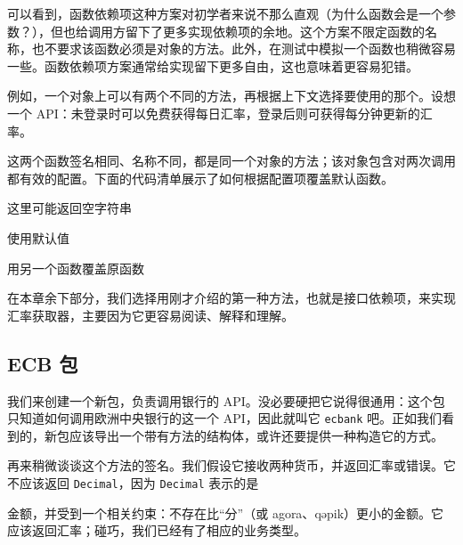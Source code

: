 可以看到，函数依赖项这种方案对初学者来说不那么直观（为什么函数会是一个参数？），但也给调用方留下了更多实现依赖项的余地。这个方案不限定函数的名称，也不要求该函数必须是对象的方法。此外，在测试中模拟一个函数也稍微容易一些。函数依赖项方案通常给实现留下更多自由，这也意味着更容易犯错。

例如，一个对象上可以有两个不同的方法，再根据上下文选择要使用的那个。设想一个 API：未登录时可以免费获得每日汇率，登录后则可获得每分钟更新的汇率。

这两个函数签名相同、名称不同，都是同一个对象的方法；该对象包含对两次调用都有效的配置。下面的代码清单展示了如何根据配置项覆盖默认函数。


\begin{codeannotations}
\item 这里可能返回空字符串
\item 使用默认值
\item 用另一个函数覆盖原函数
\end{codeannotations}

在本章余下部分，我们选择用刚才介绍的第一种方法，也就是接口依赖项，来实现汇率获取器，主要因为它更容易阅读、解释和理解。

\subsection{ECB 包}

我们来创建一个新包，负责调用银行的 API。没必要硬把它说得很通用：这个包只知道如何调用欧洲中央银行的这一个 API，因此就叫它 \texttt{ecbank} 吧。正如我们看到的，新包应该导出一个带有方法的结构体，或许还要提供一种构造它的方式。

再来稍微谈谈这个方法的签名。我们假设它接收两种货币，并返回汇率或错误。它不应该返回 \texttt{Decimal}，因为 \texttt{Decimal} 表示的是

金额，并受到一个相关约束：不存在比“分”（或 agora、{\selectfont qəpik}）更小的金额。它应该返回汇率；碰巧，我们已经有了相应的业务类型。

